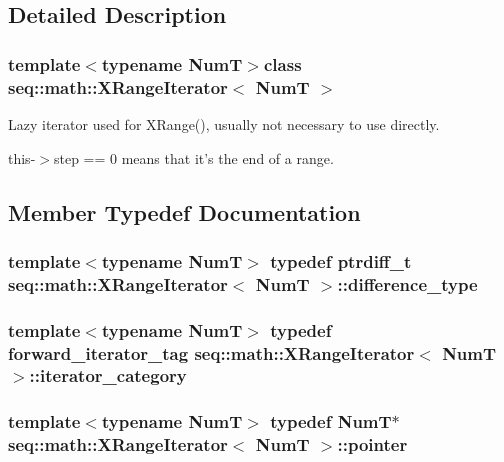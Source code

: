 \subsection{Detailed Description}
\subsubsection*{template$<$typename Num\-T$>$class seq\-::math\-::\-X\-Range\-Iterator$<$ Num\-T $>$}

Lazy iterator used for X\-Range(), usually not necessary to use directly. 

{\ttfamily this-\/$>$step == 0} means that it's the end of a range. 

\subsection{Member Typedef Documentation}
\hypertarget{classseq_1_1math_1_1_x_range_iterator_aff997a44dcd04a95ae2e0255d9cdaf43}{
\subsubsection[{difference\-\_\-type}]{\setlength{\rightskip}{0pt plus 5cm}template$<$typename Num\-T$>$ typedef ptrdiff\-\_\-t {\bf seq\-::math\-::\-X\-Range\-Iterator}$<$ Num\-T $>$\-::{\bf difference\-\_\-type}}}\label{classseq_1_1math_1_1_x_range_iterator_aff997a44dcd04a95ae2e0255d9cdaf43}
\hypertarget{classseq_1_1math_1_1_x_range_iterator_afa575aa34d0b2740ccfbd9ca512309a0}{
\subsubsection[{iterator\-\_\-category}]{\setlength{\rightskip}{0pt plus 5cm}template$<$typename Num\-T$>$ typedef forward\-\_\-iterator\-\_\-tag {\bf seq\-::math\-::\-X\-Range\-Iterator}$<$ Num\-T $>$\-::{\bf iterator\-\_\-category}}}\label{classseq_1_1math_1_1_x_range_iterator_afa575aa34d0b2740ccfbd9ca512309a0}
\hypertarget{classseq_1_1math_1_1_x_range_iterator_a594e9803c20ec88fc489fc70e61b13a2}{
\subsubsection[{pointer}]{\setlength{\rightskip}{0pt plus 5cm}template$<$typename Num\-T$>$ typedef Num\-T$\ast$ {\bf seq\-::math\-::\-X\-Range\-Iterator}$<$ Num\-T $>$\-::{\bf pointer}}}\label{classseq_1_1math_1_1_x_range_iterator_a594e9803c20ec88fc489fc70e61b13a2}
